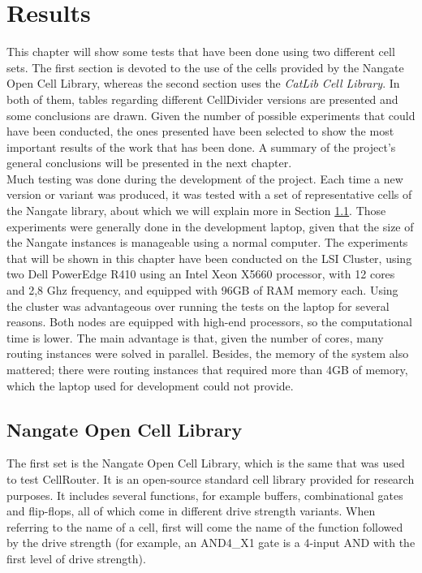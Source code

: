 \chapter{Results}
\label{cha:results}

This chapter will show some tests that have been done using two different cell sets. The first section is devoted to the use of the cells provided by the Nangate Open Cell Library, whereas the second section uses the \textit{CatLib Cell Library}. In both of them, tables regarding different CellDivider versions are presented and some conclusions are drawn. Given the number of possible experiments that could have been conducted, the ones presented have been selected to show the most important results of the work that has been done. A summary of the project's general conclusions will be presented in the next chapter. \\

Much testing was done during the development of the project. Each time a new version or variant was produced, it was tested with a set of representative cells of the Nangate library, about which we will explain more in Section \ref{sec:nangate}. Those experiments were generally done in the development laptop, given that the size of the Nangate instances is manageable using a normal computer. The experiments that will be shown in this chapter have been conducted on the LSI Cluster, using two Dell PowerEdge R410 using an Intel Xeon X5660 processor, with 12 cores and 2,8 Ghz frequency, and equipped with 96GB of RAM memory each. Using the cluster was advantageous over running the tests on the laptop for several reasons. Both nodes are equipped with high-end processors, so the computational time is lower. The main advantage is that, given the number of cores, many routing instances were solved in parallel. Besides, the memory of the system also mattered; there were routing instances that required more than 4GB of memory, which the laptop used for development could not provide. \\

\section{Nangate Open Cell Library}
\label{sec:nangate}

The first set is the Nangate Open Cell Library, which is the same that was used to test CellRouter. It is an open-source standard cell library provided for research purposes. It includes several  functions, for example buffers, combinational gates and flip-flops, all of which come in different drive strength variants. When referring to the name of a cell, first will come the name of the function followed by the drive strength (for example, an AND4\_X1 gate is a 4-input AND with the first level of drive strength). \\

